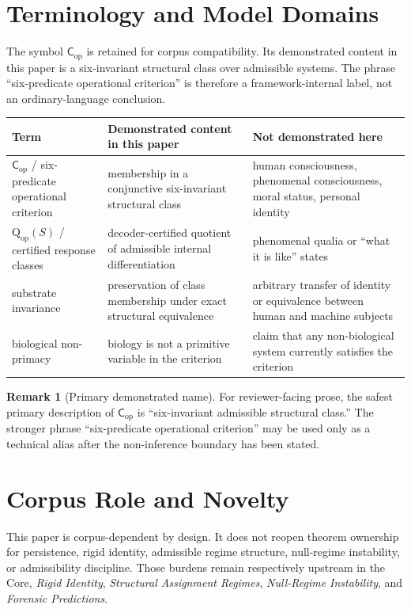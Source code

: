 \documentclass[11pt,a4paper]{article}
\theoremstyle{definition}
\newtheorem{remark}[theorem]{Remark}
\newcommand{\Cop}{\mathsf{C}_{\mathrm{op}}}
\newcommand{\Qop}{\mathrm{Q}_{\mathrm{op}}}
\begin{document}
\section{Terminology and Model Domains}
The symbol $\Cop$ is retained for corpus compatibility. Its demonstrated
content in this paper is a six-invariant structural class over admissible
systems. The phrase ``six-predicate operational criterion'' is therefore a
framework-internal label, not an ordinary-language conclusion.

\begin{center}
\renewcommand{\arraystretch}{1.16}
\begin{tabularx}{\linewidth}{@{}lY Y@{}}
\toprule
Term & Demonstrated content in this paper & Not demonstrated here \\
\midrule
$\Cop$ / six-predicate operational criterion & membership in a conjunctive six-invariant structural class & human consciousness, phenomenal consciousness, moral status, personal identity \\
$\Qop(S)$ / certified response classes & decoder-certified quotient of admissible internal differentiation & phenomenal qualia or ``what it is like'' states \\
substrate invariance & preservation of class membership under exact structural equivalence & arbitrary transfer of identity or equivalence between human and machine subjects \\
biological non-primacy & biology is not a primitive variable in the criterion & claim that any non-biological system currently satisfies the criterion \\
\bottomrule
\end{tabularx}
\end{center}

\begin{remark}[Primary demonstrated name]
For reviewer-facing prose, the safest primary description of $\Cop$ is
``six-invariant admissible structural class.'' The stronger phrase
``six-predicate operational criterion'' may be used only as a technical alias after the
non-inference boundary has been stated.
\end{remark}

\section{Corpus Role and Novelty}
This paper is corpus-dependent by design. It does not reopen theorem ownership for persistence, rigid identity, admissible regime structure, null-regime instability, or admissibility discipline. Those burdens remain respectively upstream in the Core, \textit{Rigid Identity}, \textit{Structural Assignment Regimes}, \textit{Null-Regime Instability}, and \textit{Forensic Predictions}.
\end{document}
